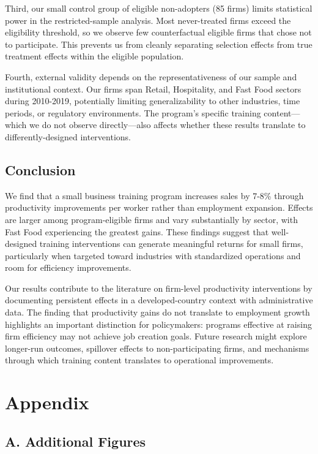 \documentclass{article}
\begin{document}
Third, our small control group of eligible non-adopters (85 firms) limits statistical power in the restricted-sample analysis. Most never-treated firms exceed the eligibility threshold, so we observe few counterfactual eligible firms that chose not to participate. This prevents us from cleanly separating selection effects from true treatment effects within the eligible population.

Fourth, external validity depends on the representativeness of our sample and institutional context. Our firms span Retail, Hospitality, and Fast Food sectors during 2010-2019, potentially limiting generalizability to other industries, time periods, or regulatory environments. The program's specific training content—which we do not observe directly—also affects whether these results translate to differently-designed interventions.

\subsection{Conclusion}

We find that a small business training program increases sales by 7-8\% through productivity improvements per worker rather than employment expansion. Effects are larger among program-eligible firms and vary substantially by sector, with Fast Food experiencing the greatest gains. These findings suggest that well-designed training interventions can generate meaningful returns for small firms, particularly when targeted toward industries with standardized operations and room for efficiency improvements.

Our results contribute to the literature on firm-level productivity interventions by documenting persistent effects in a developed-country context with administrative data. The finding that productivity gains do not translate to employment growth highlights an important distinction for policymakers: programs effective at raising firm efficiency may not achieve job creation goals. Future research might explore longer-run outcomes, spillover effects to non-participating firms, and mechanisms through which training content translates to operational improvements.

\section*{Appendix}

\subsection*{A. Additional Figures}
\end{document}
